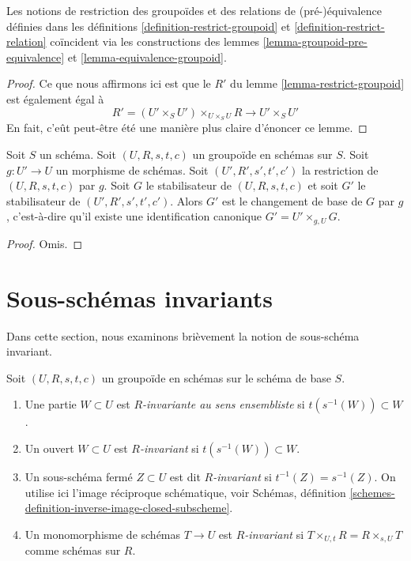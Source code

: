 \begin{lemma}
\label{lemma-restrict-groupoid-relation}
Les notions de restriction des groupoïdes et des
relations de (pré-)équivalence définies dans les définitions
\ref{definition-restrict-groupoid} et \ref{definition-restrict-relation}
coïncident via les constructions des
lemmes \ref{lemma-groupoid-pre-equivalence} et
\ref{lemma-equivalence-groupoid}.
\end{lemma}

\begin{proof}
Ce que nous affirmons ici est que le $R'$ du
lemme \ref{lemma-restrict-groupoid} est également
égal à
$$
R' = (U' \times_S U')\times_{U \times_S U} R
\longrightarrow
U' \times_S U'
$$
En fait, c'eût peut-être été une manière plus claire d'énoncer ce lemme.
\end{proof}

\begin{lemma}
\label{lemma-restrict-stabilizer}
Soit $S$ un schéma.
Soit $(U, R, s, t, c)$ un groupoïde en schémas sur $S$.
Soit $g : U' \to U$ un morphisme de schémas.
Soit $(U', R', s', t', c')$ la restriction de $(U, R, s, t, c)$ par $g$.
Soit $G$ le stabilisateur de $(U, R, s, t, c)$ et soit
$G'$ le stabilisateur de $(U', R', s', t', c')$.
Alors $G'$ est le changement de base de $G$ par $g$, c'est-à-dire
qu'il existe une identification canonique $G' = U' \times_{g, U} G$.
\end{lemma}

\begin{proof}
Omis.
\end{proof}






\section{Sous-schémas invariants}
\label{section-invariant}

\noindent
Dans cette section, nous examinons brièvement la notion de sous-schéma invariant.

\begin{definition}
\label{definition-invariant-open}
Soit $(U, R, s, t, c)$ un groupoïde en schémas sur le schéma de base $S$.
\begin{enumerate}
\item Une partie $W \subset U$ est {\it $R$-invariante au sens ensembliste}
si $t(s^{-1}(W)) \subset W$.
\item Un ouvert $W \subset U$ est {\it $R$-invariant} si
$t(s^{-1}(W)) \subset W$.
\item Un sous-schéma fermé $Z \subset U$ est dit {\it $R$-invariant}
si $t^{-1}(Z) = s^{-1}(Z)$. On utilise ici l'image réciproque schématique, voir
Schémas, définition \ref{schemes-definition-inverse-image-closed-subscheme}.
\item Un monomorphisme de schémas $T \to U$ est {\it $R$-invariant} si
$T \times_{U, t} R = R \times_{s, U} T$ comme schémas sur $R$.
\end{enumerate}
\end{definition}

